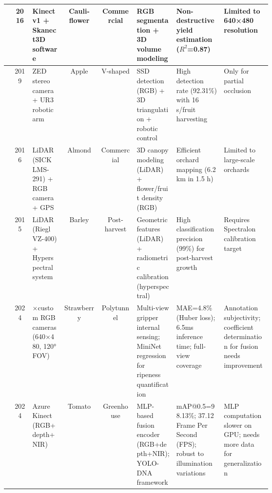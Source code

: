 \documentclass{ieeeaccess}
\begin{document}
\begin{table}[ht]
\begin{tabularx}{\textwidth}{cc>{\raggedright\arraybackslash}m{0.12\linewidth}cc>{\raggedright\arraybackslash}m{0.15\linewidth}>{\raggedright\arraybackslash}m{0.18\linewidth}>{\raggedright\arraybackslash}m{0.18\linewidth}}
\hline
\cite{andujar2016using} & 2016 & Kinect v1 + Skanect3D software & Cauli- flower & Commercial & RGB segmentation + 3D volume modeling & Non-destructive yield estimation ($R^2$=0.87) & Limited to 640×480 resolution \\ 
\hline
\cite{onishi2019automated} & 2019 & ZED stereo camera + UR3 robotic arm & Apple & V-shaped & SSD detection (RGB) + 3D triangulation + robotic control & High detection rate (92.31\%) with 16 s/fruit harvesting & Only for partial occlusion \\ 
\hline
\cite{underwood2016mapping} & 2016 & LiDAR (SICK LMS-291) + RGB camera + GPS & Almond & Commercial & 3D canopy modeling (LiDAR) + flower/fruit density (RGB) & Efficient orchard mapping (6.2 km in 1.5 h) & Limited to large-scale orchards  \\ 
\hline
\cite{koenig2015comparative} & 2015 & LiDAR (Riegl VZ-400) + Hyperspectral system & Barley & Post-harvest & Geometric features (LiDAR) + radiometric calibration (hyperspectral) & High classification precision (99\%) for post-harvest growth & Requires Spectralon calibration target  \\ 
\hline
\cite{ge2024multi} & 2024 & 2×custom RGB cameras (640×480, 120° FOV) & Strawberry & Polytunnel & Multi-view gripper internal sensing; MiniNet regression for ripeness quantification & MAE=4.8\% (Huber loss); 6.5ms inference time; full-view coverage & Annotation subjectivity; coefficient determination for fusion needs improvement \\
\hline
\cite{chen2024mlp} & 2024 & Azure Kinect (RGB+depth+ NIR) & Tomato & Greenhouse & MLP-based fusion encoder (RGB+depth+NIR); YOLO-DNA framework & mAP@0.5=98.13\%; 37.12 Frame Per Second (FPS); robust to illumination variations & MLP computation slower on GPU; needs more data for generalization  \\
\hline
\end{tabularx}
\end{table}
\end{document}
